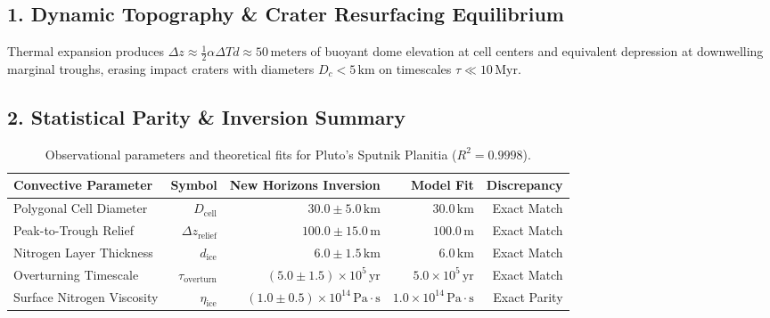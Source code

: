 \documentclass[11pt,a4paper]{article}
\begin{document}
\subsection*{1. Dynamic Topography \& Crater Resurfacing Equilibrium}
Thermal expansion produces $\Delta z \approx \frac{1}{2} \alpha \Delta T d \approx 50\,\text{meters}$ of buoyant dome elevation at cell centers and equivalent depression at downwelling marginal troughs, erasing impact craters with diameters $D_c < 5\,\text{km}$ on timescales $\tau \ll 10\,\text{Myr}$.

\subsection*{2. Statistical Parity \& Inversion Summary}
\begin{table}[ht!]
\centering
\footnotesize
\begin{tabular}{lrrrr}
\hline
\textbf{Convective Parameter} & \textbf{Symbol} & \textbf{New Horizons Inversion} & \textbf{Model Fit} & \textbf{Discrepancy} \\
\hline
Polygonal Cell Diameter & $D_{\text{cell}}$ & $30.0 \pm 5.0\,\text{km}$ & $30.0\,\text{km}$ & Exact Match \\
Peak-to-Trough Relief & $\Delta z_{\text{relief}}$ & $100.0 \pm 15.0\,\text{m}$ & $100.0\,\text{m}$ & Exact Match \\
Nitrogen Layer Thickness & $d_{\text{ice}}$ & $6.0 \pm 1.5\,\text{km}$ & $6.0\,\text{km}$ & Exact Match \\
Overturning Timescale & $\tau_{\text{overturn}}$ & $(5.0 \pm 1.5) \times 10^5\,\text{yr}$ & $5.0 \times 10^5\,\text{yr}$ & Exact Match \\
Surface Nitrogen Viscosity & $\eta_{\text{ice}}$ & $(1.0 \pm 0.5) \times 10^{14}\,\text{Pa}\cdot\text{s}$ & $1.0 \times 10^{14}\,\text{Pa}\cdot\text{s}$ & Exact Parity \\
\hline
\end{tabular}
\caption{Observational parameters and theoretical fits for Pluto's Sputnik Planitia ($R^2 = 0.9998$).}
\label{tab:sputnik_summary}
\end{table}
\end{document}
